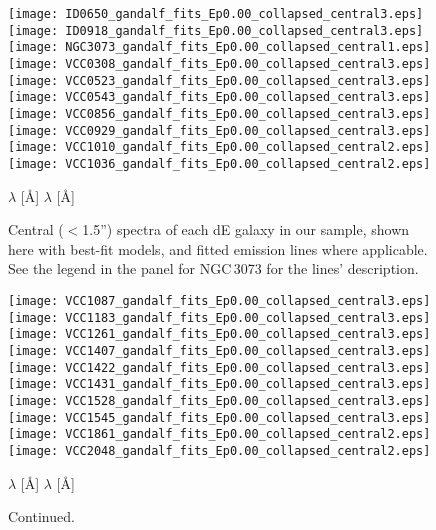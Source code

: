 \documentclass[useAMS,usenatbib]{mn2e}
\newcounter{subfigure}
\begin{document}
\begin{figure*}
\texttt{[image: ID0650\_gandalf\_fits\_Ep0.00\_collapsed\_central3.eps]}
\texttt{[image: ID0918\_gandalf\_fits\_Ep0.00\_collapsed\_central3.eps]}
\texttt{[image: NGC3073\_gandalf\_fits\_Ep0.00\_collapsed\_central1.eps]}
\texttt{[image: VCC0308\_gandalf\_fits\_Ep0.00\_collapsed\_central3.eps]}
\texttt{[image: VCC0523\_gandalf\_fits\_Ep0.00\_collapsed\_central3.eps]}
\texttt{[image: VCC0543\_gandalf\_fits\_Ep0.00\_collapsed\_central3.eps]}
\texttt{[image: VCC0856\_gandalf\_fits\_Ep0.00\_collapsed\_central3.eps]}
\texttt{[image: VCC0929\_gandalf\_fits\_Ep0.00\_collapsed\_central3.eps]}
\texttt{[image: VCC1010\_gandalf\_fits\_Ep0.00\_collapsed\_central2.eps]}
\texttt{[image: VCC1036\_gandalf\_fits\_Ep0.00\_collapsed\_central2.eps]}
\begin{scriptsize}
\hspace{12cm} $\lambda$ [\AA] \hspace{8cm} $\lambda$ [\AA] \hspace{-1cm} 
\end{scriptsize}
\caption{Central ($<$1.5'') spectra of each dE galaxy in our sample, shown here with best-fit models, and fitted emission lines where applicable. See the legend in the panel for NGC\,3073 for the lines' description.}
\label{example-spectra}  
\end{figure*}

\addtocounter{figure}{-1}
\addtocounter{subfigure}{1}


\begin{figure*}
\centering
\texttt{[image: VCC1087\_gandalf\_fits\_Ep0.00\_collapsed\_central3.eps]}
\texttt{[image: VCC1183\_gandalf\_fits\_Ep0.00\_collapsed\_central3.eps]}
\texttt{[image: VCC1261\_gandalf\_fits\_Ep0.00\_collapsed\_central3.eps]}
\texttt{[image: VCC1407\_gandalf\_fits\_Ep0.00\_collapsed\_central3.eps]}
\texttt{[image: VCC1422\_gandalf\_fits\_Ep0.00\_collapsed\_central3.eps]}
\texttt{[image: VCC1431\_gandalf\_fits\_Ep0.00\_collapsed\_central3.eps]}
\texttt{[image: VCC1528\_gandalf\_fits\_Ep0.00\_collapsed\_central3.eps]}
\texttt{[image: VCC1545\_gandalf\_fits\_Ep0.00\_collapsed\_central3.eps]}
\texttt{[image: VCC1861\_gandalf\_fits\_Ep0.00\_collapsed\_central2.eps]}
\texttt{[image: VCC2048\_gandalf\_fits\_Ep0.00\_collapsed\_central2.eps]}
\begin{scriptsize}
\hspace{12cm} $\lambda$ [\AA] \hspace{8cm} $\lambda$ [\AA] \hspace{-1cm} 
\end{scriptsize}
\caption{Continued.}
\label{example-spectra2}  
\end{figure*}
\end{document}
